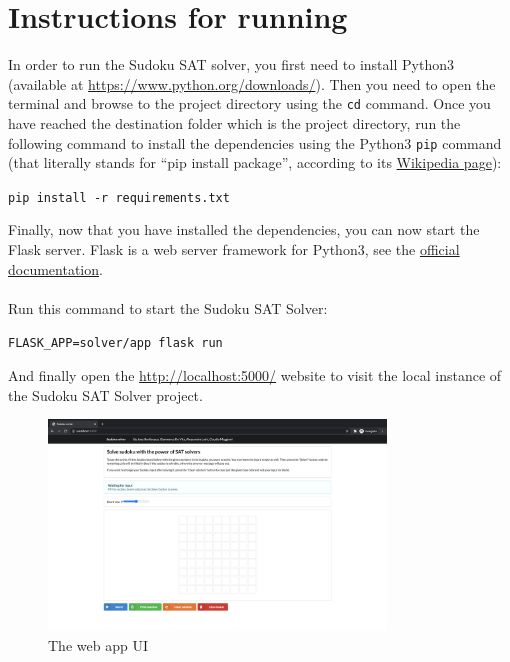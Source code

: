\documentclass[]{usiinfprospectus}
\newcounter{row}
\begin{document}
\newpage

\section{Instructions for running}

In order to run the Sudoku SAT solver, you first need to install Python3
(available at \url{https://www.python.org/downloads/}). Then you need to open
the terminal and browse to the project directory using the \texttt{cd} command.
Once you have reached the destination folder which is the project directory, run
the following command to install the dependencies using the Python3 \texttt{pip}
command (that literally stands for ``pip install package'', according to its
\href{https://en.wikipedia.org/wiki/Pip\_(package\_manager)}{Wikipedia page}):

\begin{center}
\texttt{pip install -r requirements.txt}
\end{center}

\noindent Finally, now that you have installed the dependencies, you can now
start the Flask server. Flask is a web server framework for Python3, see the
\href{https://flask.palletsprojects.com/}{official documentation}.\\ \\ Run this
command to start the Sudoku SAT Solver:

\begin{center}
\texttt{FLASK\_APP=solver/app flask run}
\end{center}

\noindent
And finally open the \url{http://localhost:5000/} website to visit the local
instance of the Sudoku SAT Solver project.

\begin{figure}[ht]
\centering
\includegraphics[width=0.8\textwidth]{pics/app_ui.png}
\caption{The web app UI}
\end{figure}
\end{document}
